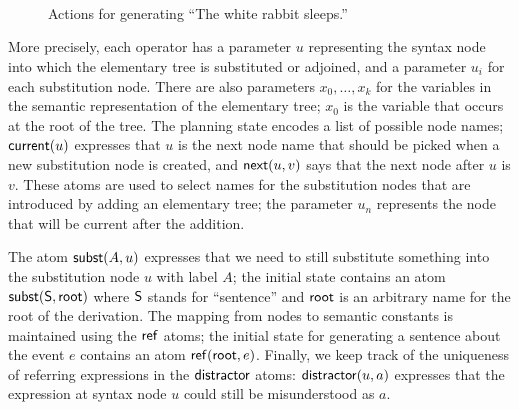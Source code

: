 \begin{figure}
{\small%
\\

\\

}\strut\\[-5ex]
\caption{Actions for generating ``The white rabbit
sleeps.''}
\label{fig:white-rabbit-as-planning}
\end{figure}

More precisely, each operator has a parameter $u$ representing the
syntax node into which the elementary tree is substituted or adjoined,
and a parameter $u_i$ for each substitution node.  There are also
parameters $x_0,\ldots,x_k$ for the variables in the semantic
representation of the elementary tree; $x_0$ is the variable that
occurs at the root of the tree.  The planning state encodes a list of
possible node names; $\mathsf{current}(u)$ expresses that $u$ is the next
node name that should be picked when a new substitution node is
created, and $\mathsf{next}(u,v)$ says that the next node after $u$ is
$v$. These atoms are used to select names for the substitution nodes
that are introduced by adding an elementary tree; the parameter $u_n$
represents the node that will be current after the addition.

The atom $\mathsf{subst}(A,u)$ expresses that we need to still substitute
something into the substitution node $u$ with label $A$; the initial
state contains an atom $\mathsf{subst}(\mathsf{S},\mathsf{root})$ where $\mathsf{S}$
stands for ``sentence'' and $\mathsf{root}$ is an arbitrary name for the
root of the derivation.  The mapping from nodes to semantic constants
is maintained using the $\mathsf{ref}$ atoms; the initial state for
generating a sentence about the event $e$ contains an atom
$\mathsf{ref}(\mathsf{root},e)$.  Finally, we keep track of the uniqueness of
referring expressions in the $\mathsf{distractor}$ atoms:
$\mathsf{distractor}(u,a)$ expresses that the expression at syntax node $u$
could still be misunderstood as $a$.

